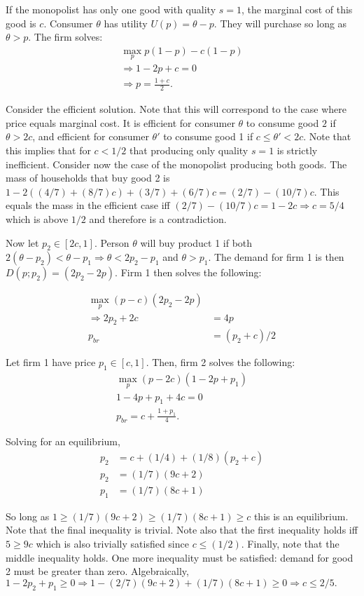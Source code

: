 \documentclass[11pt]{article} %
\begin{document}
If the monopolist has only one good with quality $s=1$, the marginal cost of this good is $c$. Consumer $\theta$ has utility $U(p) = \theta - p$. They will purchase so long as $\theta>p$. The firm solves:
\begin{align*}
\max_{p} p(1-p) - c(1-p) \\
\Rightarrow 1 - 2p +c = 0 \\
\Rightarrow p = \frac{1+c}{2}.
\end{align*}


Consider the efficient solution. Note that this will correspond to the case where price equals marginal cost. It is efficient for consumer $\theta$ to consume good $2$ if $\theta>2c$, and efficient for consumer $\theta'$ to consume good 1 if $c\leq \theta' < 2c$. Note that this implies that for $c<1/2$ that producing only quality $s=1$ is strictly inefficient. Consider now the case of the monopolist producing both goods. The mass of households that buy good 2 is $1 - 2((4/7) + (8/7)c) + (3/7) +(6/7)c = (2/7) - (10/7)c$. This equals the mass in the efficient case iff $ (2/7) - (10/7)c = 1 - 2c \Rightarrow c = 5/4$ which is above $1/2$ and therefore is a contradiction.

Now let $p_2 \in [2c,1]$. Person $\theta$ will buy product 1 if both $2(\theta - p_2)<\theta - p_1 \Rightarrow \theta<2p_2 - p_1$ and $\theta>p_1$. The demand for firm 1 is then $D(p;p_2) = (2p_2 - 2p)$. Firm 1 then solves the following:

\begin{align*}
\max_{p} (p-c)(2p_2 - 2p)\\
\Rightarrow 2p_2 + 2c &= 4p\\
p_{br} &= (p_2+c)/2
\end{align*}

Let firm 1 have price $p_1 \in [c,1]$. Then, firm 2 solves the following:
\begin{align*}
\max_p (p-2c)(1-2p + p_1) \\
1 - 4p + p_1 + 4c = 0\\
p_{br} = c+\frac{1+p_1}{4}.
\end{align*}

Solving for an equilibrium,
\begin{align*}
p_2 &= c + (1/4) + (1/8)(p_2 + c) \\
p_2 &= (1/7)(9c + 2) \\
p_1 &= (1/7)(8c + 1)
\end{align*}

So long as $1\geq(1/7)(9c + 2)\geq (1/7)(8c + 1)\geq c$ this is an equilibrium. Note that the final inequality is trivial. Note also that the first inequality holds iff $5\geq 9c$ which is also trivially satisfied since $c\leq (1/2)$. Finally, note that the middle inequality holds. One more inequality must be satisfied: demand for good 2 must be greater than zero. Algebraically, $1-2p_2 + p_1 \geq 0 \Rightarrow 1 - (2/7)(9c+2) + (1/7)(8c+1) \geq 0 \Rightarrow c \leq 2/5.$
\end{document}
